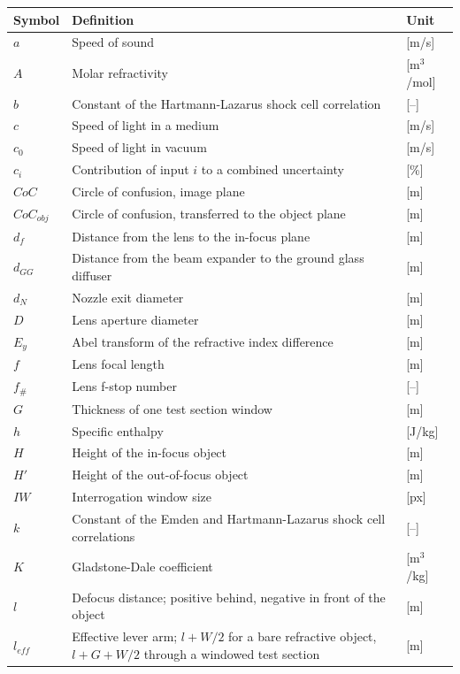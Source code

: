 \begin{longtable}{p{2.5cm}p{8cm}p{2.5cm}}
    \toprule
    Symbol & Definition & Unit \\
    \midrule\endhead %
    $a$ & Speed of sound & [m/s] \\
    $A$ & Molar refractivity & [m$^3$/mol] \\
    $b$ & Constant of the Hartmann-Lazarus shock cell correlation & [--] \\
    $c$ & Speed of light in a medium & [m/s] \\
    $c_0$ & Speed of light in vacuum & [m/s] \\
    $c_i$ & Contribution of input $i$ to a combined uncertainty & [\%] \\
    $CoC$ & Circle of confusion, image plane & [m] \\
    $CoC_{obj}$ & Circle of confusion, transferred to the object plane & [m] \\
    $d_f$ & Distance from the lens to the in-focus plane & [m] \\
    $d_{GG}$ & Distance from the beam expander to the ground glass diffuser & [m] \\
    $d_N$ & Nozzle exit diameter & [m] \\
    $D$ & Lens aperture diameter & [m] \\
    $E_y$ & Abel transform of the refractive index difference & [m] \\
    $f$ & Lens focal length & [m] \\
    $f_\#$ & Lens f-stop number & [--] \\
    $G$ & Thickness of one test section window & [m] \\
    $h$ & Specific enthalpy & [J/kg] \\
    $H$ & Height of the in-focus object & [m] \\
    $H'$ & Height of the out-of-focus object & [m] \\
    $IW$ & Interrogation window size & [px] \\
    $k$ & Constant of the Emden and Hartmann-Lazarus shock cell correlations & [--] \\
    $K$ & Gladstone-Dale coefficient & [m$^3$/kg] \\
    $l$ & Defocus distance; positive behind, negative in front of the object & [m] \\
    $l_{eff}$ & Effective lever arm; $l + W/2$ for a bare refractive object, $l + G + W/2$ through a windowed test section & [m] \\

\end{longtable}
